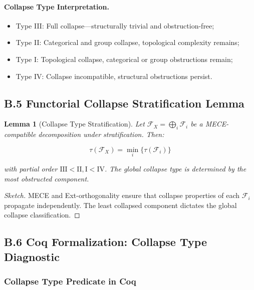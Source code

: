 \documentclass[11pt]{article}
\newtheorem{lemma}[theorem]{Lemma}
\begin{document}
\paragraph{Collapse Type Interpretation.}

\begin{itemize}
    \item Type III: Full collapse—structurally trivial and obstruction-free;
    \item Type II: Categorical and group collapse, topological complexity remains;
    \item Type I: Topological collapse, categorical or group obstructions remain;
    \item Type IV: Collapse incompatible, structural obstructions persist.
\end{itemize}

\subsection*{B.5 Functorial Collapse Stratification Lemma}

\begin{lemma}[Collapse Type Stratification]
Let \( \mathcal{F}_X = \bigoplus_i \mathcal{F}_i \) be a MECE-compatible decomposition under stratification. Then:

\[
\tau(\mathcal{F}_X) = \min_i \{ \tau(\mathcal{F}_i) \}
\]

with partial order \( \mathrm{III} < \mathrm{II}, \mathrm{I} < \mathrm{IV} \). The global collapse type is determined by the most obstructed component.

\end{lemma}

\begin{proof}[Sketch]
MECE and Ext-orthogonality ensure that collapse properties of each \( \mathcal{F}_i \) propagate independently. The least collapsed component dictates the global collapse classification.
\end{proof}

\subsection*{B.6 Coq Formalization: Collapse Type Diagnostic}

\subsubsection*{Collapse Type Predicate in Coq}
\end{document}
